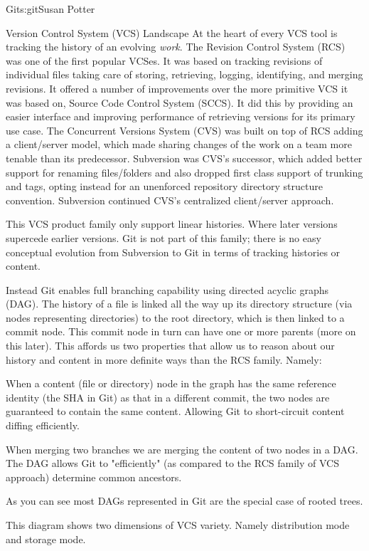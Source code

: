 \begin{aosachapter}{Git}{s:git}{Susan Potter}
\begin{aosasect1}{Version Control System (VCS) Landscape}
At the heart of every VCS tool is tracking the history of an evolving
\emph{work}. The Revision Control System (RCS) was one of the first popular
VCSes. It was based on tracking revisions of individual files taking care of
storing, retrieving, logging, identifying, and merging revisions. It offered
a number of improvements over the more primitive VCS it was based on,
Source Code Control System (SCCS). It did this by providing an easier
interface and improving performance of retrieving versions for its primary
use case. The Concurrent Versions System (CVS) was built on top of RCS adding
a client/server model, which made sharing changes of the work on a team more
tenable than its predecessor. Subversion was CVS's successor, which added
better support for renaming files/folders and also dropped first class
support of trunking and tags, opting instead for an unenforced repository
directory structure convention. Subversion continued CVS's centralized
client/server approach.

This VCS product family only support linear histories. Where later
versions supercede earlier versions. Git is not part of this family; there is
no easy conceptual evolution from Subversion to Git in terms of tracking
histories or content.

Instead Git enables full branching capability using directed acyclic
graphs (DAG). The history of a file is linked all the way
up its directory structure (via nodes representing directories) to the root
directory, which is then linked to a commit node. This commit node in turn
can have one or more parents (more on this later). This affords us two
properties that allow us to reason about our history and content in
more definite ways than the RCS family. Namely:
\begin{aosaitemize}
  \item When a content (file or directory) node in the graph has the same
  reference identity (the SHA in Git) as that in a different commit, the two
  nodes are guaranteed to contain the same content. Allowing Git to
  short-circuit content diffing efficiently.
  \item When merging two branches we are merging the content of two nodes
  in a DAG. The DAG allows Git to "efficiently" (as compared to the
  RCS family of VCS approach) determine common ancestors.
\end{aosaitemize}

As you can see most DAGs represented in Git are the special case of rooted
trees.

This diagram shows two dimensions of VCS variety. Namely distribution mode
and storage mode.


\end{aosasect1}
\end{aosachapter}

